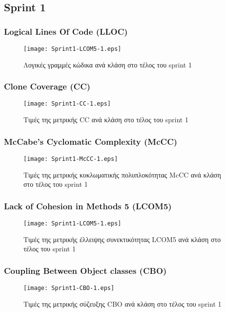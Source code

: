 \subsection{Sprint 1}

\subsubsection{Logical Lines Of Code (LLOC)}
\label{section:sprint1LLOC}

\begin{figure}
\centering
\texttt{[image: Sprint1-LCOM5-1.eps]}
\caption{Λογικές γραμμές κώδικα ανά κλάση στο τέλος του sprint 1}
\label{fig:sprint1LCOM5}
\end{figure}

\subsubsection{Clone Coverage (CC)}
\label{section:sprint1CC}

\begin{figure}
\centering
\texttt{[image: Sprint1-CC-1.eps]}
\caption{Τιμές της μετρικής CC ανά κλάση στο τέλος του sprint 1}
\label{fig:sprint1CC}
\end{figure}

\subsubsection{McCabe’s Cyclomatic Complexity (McCC)}
\label{section:sprint1McCC}

\begin{figure}
\centering
\texttt{[image: Sprint1-McCC-1.eps]}
\caption{Τιμές της μετρικής κυκλωματικής πολυπλοκότητας McCC ανά κλάση στο τέλος του sprint 1}
\label{fig:sprint1McCC}
\end{figure}

\subsubsection{Lack of Cohesion in Methods 5 (LCOM5)}
\label{section:sprint1LCOM5}

\begin{figure}
\centering
\texttt{[image: Sprint1-LCOM5-1.eps]}
\caption{Τιμές της μετρικής έλλειψης συνεκτικότητας LCOM5 ανά κλάση στο τέλος του sprint 1}
\label{fig:sprint1LCOM5}
\end{figure}

\subsubsection{Coupling Between Object classes (CBO)}
\label{section:sprint1CBO}

\begin{figure}
\centering
\texttt{[image: Sprint1-CBO-1.eps]}
\caption{Τιμές της μετρικής σύζευξης CBO ανά κλάση στο τέλος του sprint 1}
\label{fig:sprint1CBO}
\end{figure}
